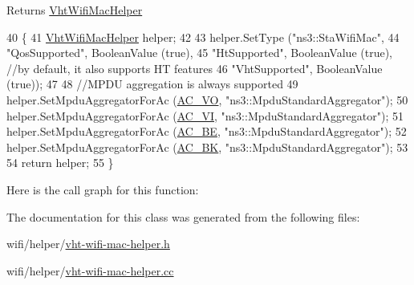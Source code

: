 \begin{DoxyReturn}{Returns}
\hyperlink{classns3_1_1VhtWifiMacHelper}{Vht\+Wifi\+Mac\+Helper} 
\end{DoxyReturn}

\begin{DoxyCode}
40 \{
41   \hyperlink{classns3_1_1VhtWifiMacHelper_ab4474c60c5a91c2dab2b13a384b0d74a}{VhtWifiMacHelper} helper;
42 
43   helper.SetType (\textcolor{stringliteral}{"ns3::StaWifiMac"},
44                   \textcolor{stringliteral}{"QosSupported"}, BooleanValue (\textcolor{keyword}{true}),
45                   \textcolor{stringliteral}{"HtSupported"}, BooleanValue (\textcolor{keyword}{true}), \textcolor{comment}{//by default, it also supports HT features}
46                   \textcolor{stringliteral}{"VhtSupported"}, BooleanValue (\textcolor{keyword}{true}));
47 
48   \textcolor{comment}{//MPDU aggregation is always supported}
49   helper.SetMpduAggregatorForAc (\hyperlink{group__wifi_ggab422b4562ba272b39a9b6bca3513f3aca147b7f007ca5459e52ee93d1ebe83639}{AC\_VO}, \textcolor{stringliteral}{"ns3::MpduStandardAggregator"});
50   helper.SetMpduAggregatorForAc (\hyperlink{group__wifi_ggab422b4562ba272b39a9b6bca3513f3aca1c60bd99c5ede59bb50b91182cb81d0f}{AC\_VI}, \textcolor{stringliteral}{"ns3::MpduStandardAggregator"});
51   helper.SetMpduAggregatorForAc (\hyperlink{group__wifi_ggab422b4562ba272b39a9b6bca3513f3aca136016fc12611734060b599355503c29}{AC\_BE}, \textcolor{stringliteral}{"ns3::MpduStandardAggregator"});
52   helper.SetMpduAggregatorForAc (\hyperlink{group__wifi_ggab422b4562ba272b39a9b6bca3513f3aca53e99420c645076e74307112d73eb38b}{AC\_BK}, \textcolor{stringliteral}{"ns3::MpduStandardAggregator"});
53 
54   \textcolor{keywordflow}{return} helper;
55 \}
\end{DoxyCode}


Here is the call graph for this function\+:




The documentation for this class was generated from the following files\+:\begin{DoxyCompactItemize}
\item 
wifi/helper/\hyperlink{vht-wifi-mac-helper_8h}{vht-\/wifi-\/mac-\/helper.\+h}\item 
wifi/helper/\hyperlink{vht-wifi-mac-helper_8cc}{vht-\/wifi-\/mac-\/helper.\+cc}\end{DoxyCompactItemize}
